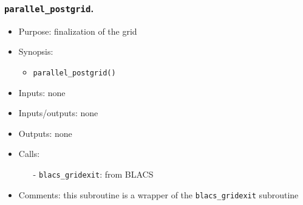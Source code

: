 \documentclass[12pt]{article}
\begin{document}
\subsubsection{{\tt parallel\_postgrid}.}
\begin{itemize}
\item Purpose: finalization of the grid
\item Synopsis: 
\begin{itemize}
\item {\tt parallel\_postgrid()}
\end{itemize}
\item Inputs: none
\item Inputs/outputs: none
\item Outputs: none
\item Calls: 
\begin{itemize}
\item[-] {\tt blacs\_gridexit}: from BLACS
\end{itemize}
\item Comments: this subroutine is a wrapper of the {\tt blacs\_gridexit} subroutine
\end{itemize} 
\end{document}

